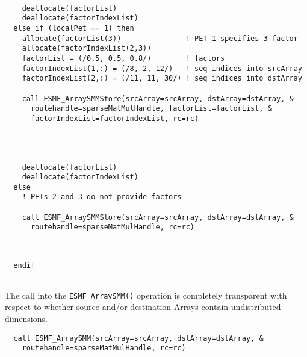 
 \begin{verbatim}
      
    deallocate(factorList)
    deallocate(factorIndexList)
  else if (localPet == 1) then
    allocate(factorList(3))               ! PET 1 specifies 3 factor
    allocate(factorIndexList(2,3))
    factorList = (/0.5, 0.5, 0.8/)        ! factors
    factorIndexList(1,:) = (/8, 2, 12/)   ! seq indices into srcArray
    factorIndexList(2,:) = (/11, 11, 30/) ! seq indices into dstArray
    
    call ESMF_ArraySMMStore(srcArray=srcArray, dstArray=dstArray, &
      routehandle=sparseMatMulHandle, factorList=factorList, &
      factorIndexList=factorIndexList, rc=rc)
 
\end{verbatim}
 

 \begin{verbatim}

      
    deallocate(factorList)
    deallocate(factorIndexList)
  else
    ! PETs 2 and 3 do not provide factors
    
    call ESMF_ArraySMMStore(srcArray=srcArray, dstArray=dstArray, &
      routehandle=sparseMatMulHandle, rc=rc)  
 
\end{verbatim}
 

 \begin{verbatim}

  endif
 
\end{verbatim}
 

   The call into the {\tt ESMF\_ArraySMM()} operation is completely
   transparent with respect to whether source and/or destination Arrays contain
   undistributed dimensions. 

 \begin{verbatim}
  call ESMF_ArraySMM(srcArray=srcArray, dstArray=dstArray, &
    routehandle=sparseMatMulHandle, rc=rc)
 
\end{verbatim}
 
